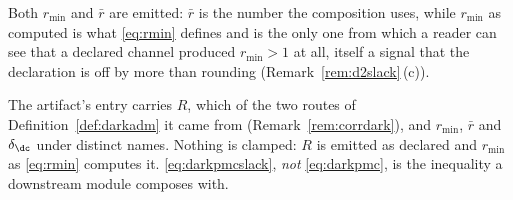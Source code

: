 
Both $r_{\min}$ and $\bar r$ are emitted: $\bar r$ is the number the
composition uses, while $r_{\min}$ as computed is what \eqref{eq:rmin} defines
and is the only one from which a reader can see that a declared channel
produced $r_{\min}>1$ at all, itself a signal that the declaration is off by
more than rounding (Remark~\ref{rem:d2slack}\,(c)).

\begin{requirement}\label{req:dark-channel-record}
The artifact's  entry carries $R$, which of the two
routes of Definition~\ref{def:darkadm} it came from
(Remark~\ref{rem:corrdark}), and $r_{\min}$, $\bar r$ and $\delta_{\dc}$ under
distinct names. Nothing is clamped: $R$ is emitted as declared and $r_{\min}$
as \eqref{eq:rmin} computes it. \eqref{eq:darkpmcslack}, \emph{not}
\eqref{eq:darkpmc}, is the inequality a downstream module composes with.
\end{requirement}

